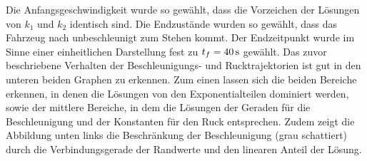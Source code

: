 Die Anfangsgeschwindigkeit wurde so gewählt, dass die Vorzeichen der Lösungen von $k_1$ und $k_2$ identisch sind. Die Endzustände wurden so gewählt, dass das Fahrzeug nach  unbeschleunigt zum Stehen kommt. Der Endzeitpunkt wurde im Sinne einer einheitlichen Darstellung fest zu $t_f = 40\,\mathrm{s}$ gewählt. Das zuvor beschriebene Verhalten der Beschleunigungs- und Rucktrajektorien ist gut in den unteren beiden Graphen zu erkennen. Zum einen lassen sich die beiden Bereiche erkennen, in denen die Lösungen von den Exponentialteilen dominiert werden, sowie der mittlere Bereiche, in dem die Lösungen der Geraden für die Beschleunigung und der Konstanten für den Ruck entsprechen. Zudem zeigt die Abbildung unten links die Beschränkung der Beschleunigung (grau schattiert) durch die Verbindungsgerade der Randwerte und den linearen Anteil der Lösung.

